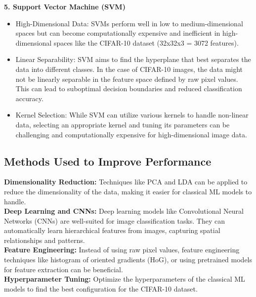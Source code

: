 \documentclass[a4paper]{article}
\theoremstyle{plain}
\theoremstyle{definition}
\begin{document}
\begin{enumerate}
\textbf{5. Support Vector Machine (SVM)}
\begin{itemize}
    \item High-Dimensional Data: SVMs perform well in low to medium-dimensional spaces but can become computationally expensive and inefficient in high-dimensional spaces like the CIFAR-10 dataset (32x32x3 = 3072 features).
    \item Linear Separability: SVM aims to find the hyperplane that best separates the data into different classes. In the case of CIFAR-10 images, the data might not be linearly separable in the feature space defined by raw pixel values. This can lead to suboptimal decision boundaries and reduced classification accuracy.
    \item Kernel Selection: While SVM can utilize various kernels to handle non-linear data, selecting an appropriate kernel and tuning its parameters can be challenging and computationally expensive for high-dimensional image data.
\end{itemize}

\subsection{Methods Used to Improve Performance }
\textbf{Dimensionality Reduction:} Techniques like PCA and LDA can be applied to reduce the dimensionality of the data, making it easier for classical ML models to handle.\\
\textbf{Deep Learning and CNNs:} Deep learning models like Convolutional Neural Networks (CNNs) are well-suited for image classification tasks. They can automatically learn hierarchical features from images, capturing spatial relationships and patterns.\\
\textbf{Feature Engineering:} Instead of using raw pixel values, feature engineering techniques like histogram of oriented gradients (HoG), or using pretrained models for feature extraction can be beneficial.\\
\textbf{Hyperparameter Tuning:} Optimize the hyperparameters of the classical ML models to find the best configuration for the CIFAR-10 dataset.\\


\end{enumerate}
\end{document}
